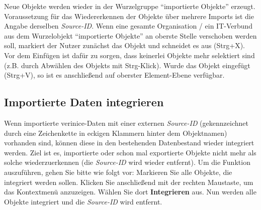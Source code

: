 \documentclass[a4paper,10pt]{book}
\begin{document}
Neue Objekte werden wieder in der Wurzelgruppe ``importierte Objekte'' erzeugt. Voraussetzung für das Wiedererkennen der Objekte über mehrere Imports ist die Angabe derselben \textit{Source-ID}.
\newline
Wenn eine gesamte Organisation / ein IT-Verbund aus dem Wurzelobjekt ``importierte Objekte'' an oberste Stelle verschoben werden soll, markiert der Nutzer zunächst das
Objekt und schneidet es aus (Strg+X). Vor dem Einfügen ist dafür zu sorgen, dass keinerlei Objekte mehr selektiert sind (z.B. durch Abwählen des
Objekts mit Strg-Klick). Wurde das Objekt eingefügt (Strg+V), so ist es anschließend auf oberster Element-Ebene verfügbar.

\subsection{Importierte Daten integrieren} \label{Importiere Daten integrieren}
Wenn importierte verinice-Daten mit einer externen \textit{Source-ID} (gekennzeichnet durch eine Zeichenkette in eckigen Klammern hinter dem Objektnamen) vorhanden sind, können diese in den bestehenden Datenbestand
wieder integriert werden. Ziel ist es, importierte oder schon mal exportierte Objekte nicht mehr als solche wiederzuerkennen (die \textit{Source-ID} wird wieder entfernt).
Um die Funktion auszuführen, gehen Sie bitte wie folgt vor: Markieren Sie alle Objekte, die integriert werden sollen. Klicken Sie anschließend mit der rechten Maustaste, um das Kontextmenü anzuzeigen.
Wählen Sie dort \textbf{Integrieren} aus. Nun werden alle Objekte integriert und die \textit{Source-ID} wird entfernt.
\end{document}
